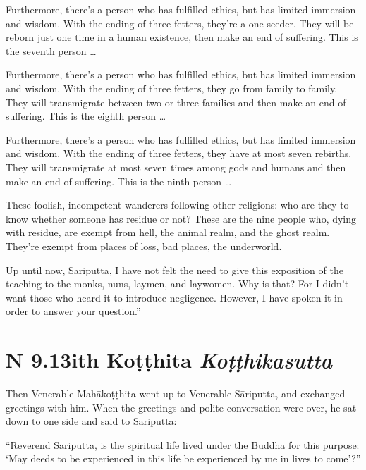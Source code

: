 \documentclass[12pt,openany]{book}%
\newcommand*{\suttatitleacronym}[1]{\smaller[2]{#1}\vspace*{.3em}}
\newcommand*{\suttatitletranslation}[1]{\linebreak{#1}}
\newcommand*{\suttatitleroot}[1]{\linebreak\smaller[2]\itshape{#1}}
\newcommand*{\tocacronym}[1]{\hspace*{-3.3em}{#1}\quad}
\newcommand*{\toctranslation}[1]{#1}
\newcommand*{\tocroot}[1]{(\textit{#1})}
\begin{document}
Furthermore, there’s a person who has fulfilled ethics, but has limited immersion and wisdom. With the ending of three fetters, they’re a one-seeder. They will be reborn just one time in a human existence, then make an end of suffering. This is the seventh person … 

Furthermore, there’s a person who has fulfilled ethics, but has limited immersion and wisdom. With the ending of three fetters, they go from family to family. They will transmigrate between two or three families and then make an end of suffering. This is the eighth person … 

Furthermore, there’s a person who has fulfilled ethics, but has limited immersion and wisdom. With the ending of three fetters, they have at most seven rebirths. They will transmigrate at most seven times among gods and humans and then make an end of suffering. This is the ninth person … 

These foolish, incompetent wanderers following other religions: who are they to know whether someone has residue or not? These are the nine people who, dying with residue, are exempt from hell, the animal realm, and the ghost realm. They’re exempt from places of loss, bad places, the underworld. 

Up until now, \textsanskrit{Sāriputta}, I have not felt the need to give this exposition of the teaching to the monks, nuns, laymen, and laywomen. Why is that? For I didn’t want those who heard it to introduce negligence. However, I have spoken it in order to answer your question.” 

%
\section*{{\suttatitleacronym AN 9.13}{\suttatitletranslation With Koṭṭhita }{\suttatitleroot Koṭṭhikasutta}}
\addcontentsline{toc}{section}{\tocacronym{AN 9.13} \toctranslation{With Koṭṭhita } \tocroot{Koṭṭhikasutta}}

Then Venerable \textsanskrit{Mahākoṭṭhita} went up to Venerable \textsanskrit{Sāriputta}, and exchanged greetings with him. When the greetings and polite conversation were over, he sat down to one side and said to \textsanskrit{Sāriputta}: 

“Reverend \textsanskrit{Sāriputta}, is the spiritual life lived under the Buddha for this purpose: ‘May deeds to be experienced in this life be experienced by me in lives to come’?” 
\end{document}
